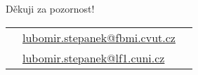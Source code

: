 \documentclass[ignorenonframetext,t]{beamer}
\begin{document}
\begin{frame}{}

\vspace{+3.0cm}\begin{block}{\centering Děkuji za pozornost!}
  \center
  \begin{tabular}{l@{}l@{}l}
    &\href{mailto:lubomir.stepanek@fbmi.cvut.cz}{lubomir.stepanek@fbmi.cvut.cz} \\
    &\href{mailto:lubomir.stepanek@lf1.cuni.cz}{lubomir.stepanek@lf1.cuni.cz}
  \end{tabular}
\end{block}

\end{frame}
\end{document}
